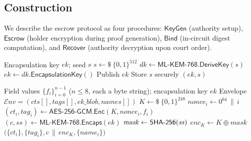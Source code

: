 \subsection{Construction}\label{sec:escrow-construction}

We describe the escrow protocol as four procedures:
$\mathsf{KeyGen}$ (authority setup),
$\mathsf{Escrow}$ (holder encryption during proof generation),
$\mathsf{Bind}$ (in-circuit digest computation), and
$\mathsf{Recover}$ (authority decryption upon court order).

\medskip

\begin{algorithm}[t]
  \caption{$\mathcal{E}.\mathsf{KeyGen}$: Escrow authority key generation}\label{alg:keygen}
  \begin{algorithmic}[1]
    \Ensure Encapsulation key $\mathit{ek}$; seed $s$
    \Statex
    \State $s \gets\!\!\!\!\$\ \{0,1\}^{512}$
    \State $\mathit{dk} \gets \textsf{ML-KEM-768}.\mathsf{DeriveKey}(s)$
    \State $\mathit{ek} \gets \mathit{dk}.\mathsf{EncapsulationKey}()$
    \State Publish $\mathit{ek}$
    \State Store $s$ securely
    \State \Return $(\mathit{ek}, s)$
  \end{algorithmic}
\end{algorithm}

\begin{algorithm}[t]
  \caption{$\mathcal{H}.\mathsf{Escrow}$: Per-presentation field encryption (holder side)}\label{alg:escrow}
  \begin{algorithmic}[1]
    \Require Field values $\{f_i\}_{i=0}^{n-1}$ ($n \leq 8$, each a byte string); encapsulation key $\mathit{ek}$
    \Ensure Envelope $\mathcal{E}\mathit{nv} = (\mathit{cts}[], \mathit{tags}[], \mathit{ek\_blob}, \mathit{names}[])$
    \Statex
    \State $K \gets\!\!\!\!\$\ \{0,1\}^{248}$
      \State $\mathit{nonce}_i \gets 0^{64} \,\|\, i$
      \State $(\mathit{ct}_i, \mathit{tag}_i) \gets \textsf{AES-256-GCM}.\mathsf{Enc}(K, \mathit{nonce}_i, f_i)$
    \EndFor
    \State $(c, \mathit{ss}) \gets \textsf{ML-KEM-768}.\mathsf{Encaps}(\mathit{ek})$
    \State $\mathit{mask} \gets \mathsf{SHA\textnormal{-}256}(\mathit{ss})$
    \State $\mathit{enc}_K \gets K \oplus \mathit{mask}$
    \State \Return $\bigl(\{\mathit{ct}_i\}, \{\mathit{tag}_i\}, c \,\|\, \mathit{enc}_K, \{\mathit{name}_i\}\bigr)$
  \end{algorithmic}
\end{algorithm}


